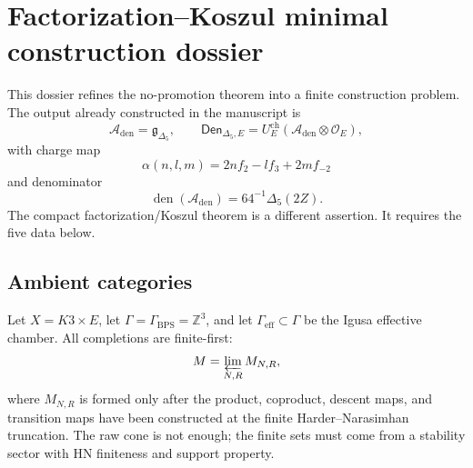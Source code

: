 \section{Factorization--Koszul minimal construction dossier}
\label{sec:factorization-koszul-minimal-data}

\providecommand{\Z}{\mathbb Z}
\providecommand{\C}{\mathbb C}
\providecommand{\Ran}{\operatorname{Ran}}
\providecommand{\Cur}{\operatorname{Cur}}
\providecommand{\Obs}{\operatorname{Obs}}
\providecommand{\Prim}{\operatorname{Prim}}
\providecommand{\Fact}{\mathsf{Fact}}
\providecommand{\ChAlg}{\mathsf{ChAlg}}
\providecommand{\Coalg}{\mathsf{Coalg}}
\providecommand{\LieSAlg}{\mathsf{LieSAlg}}
\providecommand{\Hall}{\mathcal H}
\providecommand{\hCS}{\mathrm{hCS}}
\providecommand{\BKM}{\mathrm{BKM}}
\providecommand{\barB}{\bar B}
\providecommand{\Omegach}{\Omega^{\mathrm{ch}}}
\providecommand{\Den}{\mathsf{Den}}
\providecommand{\sdim}{\operatorname{sdim}}
\providecommand{\id}{\operatorname{id}}
\providecommand{\BM}{\operatorname{BM}}
\providecommand{\Crit}{\operatorname{Crit}}
\providecommand{\van}{\varphi}

This dossier refines the no-promotion theorem into a finite construction
problem.  The output already constructed in the manuscript is
$$
\mathcal A_{\mathrm{den}}=\mathfrak g_{\Delta_5},\qquad
\Den_{\Delta_5,E}
=U_E^{\mathrm{ch}}
\left(\mathcal A_{\mathrm{den}}\otimes\mathcal O_E\right),
$$
with charge map
$$
\alpha(n,l,m)=2nf_2-lf_3+2mf_{-2}
$$
and denominator
$$
\operatorname{den}(\mathcal A_{\mathrm{den}})
=64^{-1}\Delta_5(2Z).
$$
The compact factorization/Koszul theorem is a different assertion.  It
requires the five data below.

\subsection{Ambient categories}
\label{subsec:cell-eleven-ambient-categories}

Let \(X=K3\times E\), let
\(\Gamma=\Gamma_{\mathrm{BPS}}=\Z^3\), and let
\(\Gamma_{\mathrm{eff}}\subset\Gamma\) be the Igusa effective chamber.
All completions are finite-first:
$$
M=\varprojlim_{N,R} M_{N,R},
$$
where \(M_{N,R}\) is formed only after the product, coproduct,
descent maps, and transition maps have been constructed at the finite
Harder--Narasimhan truncation.  The raw cone is not enough; the finite
sets must come from a stability sector with HN finiteness and support
property.

